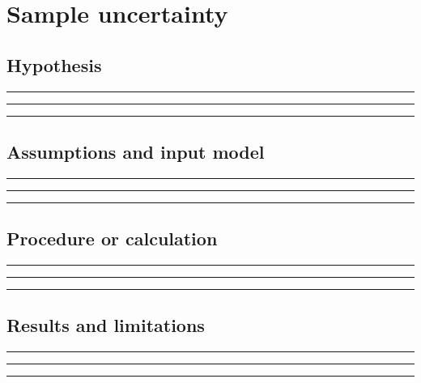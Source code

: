 \documentclass[11pt]{article}
\begin{document}
\section{Sample uncertainty}

\subsection{Hypothesis}
\noindent\rule{\linewidth}{0.35pt}\par\vspace{0.22in}
\noindent\rule{\linewidth}{0.35pt}\par\vspace{0.22in}
\noindent\rule{\linewidth}{0.35pt}\par\vspace{0.18in}

\subsection{Assumptions and input model}
\noindent\rule{\linewidth}{0.35pt}\par\vspace{0.22in}
\noindent\rule{\linewidth}{0.35pt}\par\vspace{0.22in}
\noindent\rule{\linewidth}{0.35pt}\par\vspace{0.18in}

\subsection{Procedure or calculation}
\noindent\rule{\linewidth}{0.35pt}\par\vspace{0.22in}
\noindent\rule{\linewidth}{0.35pt}\par\vspace{0.22in}
\noindent\rule{\linewidth}{0.35pt}\par\vspace{0.18in}

\subsection{Results and limitations}
\noindent\rule{\linewidth}{0.35pt}\par\vspace{0.22in}
\noindent\rule{\linewidth}{0.35pt}\par\vspace{0.22in}
\noindent\rule{\linewidth}{0.35pt}\par\vspace{0.18in}
\end{document}
